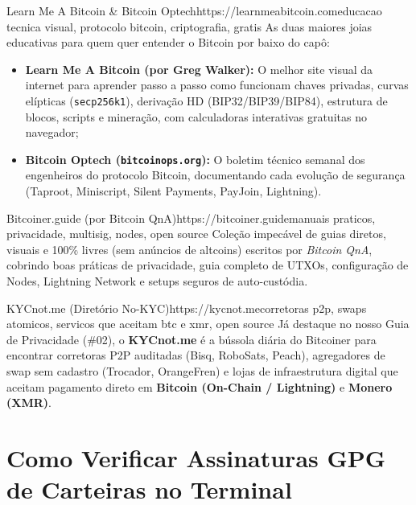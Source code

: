 \documentclass{pousadaguide}
\begin{document}
\begin{ferramenta}[goat,logo=bitcoinoptech]{Learn Me A Bitcoin \& Bitcoin Optech}{https://learnmeabitcoin.com}{educacao tecnica visual, protocolo bitcoin, criptografia, gratis}
As duas maiores joias educativas para quem quer entender o Bitcoin por baixo do capô:
\begin{itemize}
  \item \textbf{Learn Me A Bitcoin (por Greg Walker):} O melhor site visual da internet para aprender passo a passo como funcionam chaves privadas, curvas elípticas (\texttt{secp256k1}), derivação HD (BIP32/BIP39/BIP84), estrutura de blocos, scripts e mineração, com calculadoras interativas gratuitas no navegador;
  \item \textbf{Bitcoin Optech (\texttt{bitcoinops.org}):} O boletim técnico semanal dos engenheiros do protocolo Bitcoin, documentando cada evolução de segurança (Taproot, Miniscript, Silent Payments, PayJoin, Lightning).
\end{itemize}
\end{ferramenta}

\begin{ferramenta}[goat,logo=bitcoinerguide]{Bitcoiner.guide (por Bitcoin QnA)}{https://bitcoiner.guide}{manuais praticos, privacidade, multisig, nodes, open source}
Coleção impecável de guias diretos, visuais e 100\% livres (sem anúncios de altcoins) escritos por \emph{Bitcoin QnA}, cobrindo boas práticas de privacidade, guia completo de UTXOs, configuração de Nodes, Lightning Network e setups seguros de auto-custódia. 
\end{ferramenta}

\begin{ferramenta}[goat,logo=kycnot]{KYCnot.me (Diretório No-KYC)}{https://kycnot.me}{corretoras p2p, swaps atomicos, servicos que aceitam btc e xmr, open source}
Já destaque no nosso Guia de Privacidade (\#02), o \textbf{KYCnot.me} é a bússola diária do Bitcoiner para encontrar corretoras P2P auditadas (Bisq, RoboSats, Peach), agregadores de swap sem cadastro (Trocador, OrangeFren) e lojas de infraestrutura digital que aceitam pagamento direto em \textbf{Bitcoin (On-Chain / Lightning)} e \textbf{Monero (XMR)}. 
\end{ferramenta}

\section{Como Verificar Assinaturas GPG de Carteiras no Terminal}
\end{document}
